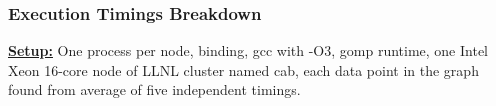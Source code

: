 {%
\begin{frame}[label=execTimings]
\frametitle{Execution Timings Breakdown}
{\tiny \textbf{\underline{Setup:}} One process per node, binding, gcc
with -O3, gomp runtime, one Intel Xeon 16-core node of LLNL cluster
named cab, each data point in the graph found from average of five independent timings.}\\



\end{frame}}
